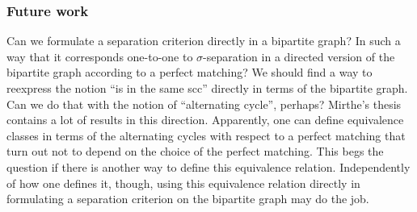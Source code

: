\subsubsection{Future work}

Can we formulate a separation criterion directly in a bipartite graph?
In such a way that it corresponds one-to-one to $\sigma$-separation in a directed version of the bipartite graph according to a perfect matching? 
We should find a way to reexpress the notion ``is in the same scc'' directly in terms of the bipartite graph. 
Can we do that with the notion of ``alternating cycle'', perhaps? Mirthe's thesis contains a lot of results in this direction.
Apparently, one can define equivalence classes in terms of the alternating cycles with respect to a perfect matching that turn
out not to depend on the choice of the perfect matching. This begs the question if there is another way to define this equivalence
relation. Independently of how one defines it, though, using this equivalence relation directly in formulating a separation 
criterion on the bipartite graph may do the job.

